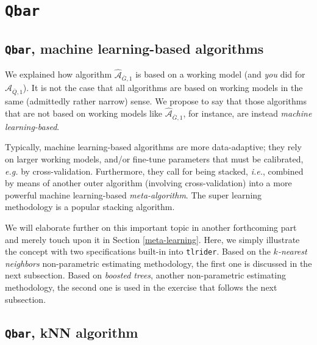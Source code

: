 \documentclass[
  11pt,
  openright,twoside]{book}
\newcommand{\Algo}{\widehat{\mathcal{A}}}
\newcommand{\Gbar}{\bar{G}}
\newcommand{\Qbar}{\bar{Q}}
\theoremstyle{definition}
\theoremstyle{definition}
\theoremstyle{definition}
\theoremstyle{definition}
\theoremstyle{remark}
\begin{document}

\hypertarget{nuisance-Qbar}{%
\section{\texorpdfstring{\texttt{Qbar}}{Qbar}}\label{nuisance-Qbar}}

\hypertarget{qbar-machine-learning-based-algorithms}{%
\subsection{\texorpdfstring{\texttt{Qbar}, machine learning-based algorithms}{Qbar, machine learning-based algorithms}}\label{qbar-machine-learning-based-algorithms}}


We explained how algorithm \(\Algo_{\Gbar,1}\) is based on a working model (and
\emph{you} did for \(\Algo_{\Qbar,1}\)). It is not the case that all algorithms are
based on working models in the same (admittedly rather narrow) sense. We
propose to say that those algorithms that are not based on working models like
\(\Algo_{\Gbar,1}\), for instance, are instead \emph{machine learning-based}.

Typically, machine learning-based algorithms are more data-adaptive; they rely
on larger working models, and/or fine-tune parameters that must be calibrated,
\emph{e.g.} by cross-validation. Furthermore,
they call for being stacked,
\emph{i.e.}, combined by means of another outer algorithm (involving
cross-validation) into a more powerful machine learning-based
\emph{meta-algorithm}. The super
learning methodology is a
popular stacking algorithm.

We will elaborate further on this important topic in another forthcoming part
and merely touch upon it in Section \ref{meta-learning}. Here, we simply
illustrate the concept with two specifications built-in into \texttt{tlrider}. Based
on the \emph{\(k\)-nearest neighbors} non-parametric estimating methodology, the
first one is discussed in the next subsection. Based on \emph{boosted trees},
another non-parametric estimating methodology, the second one is used in the
exercise that follows the next subsection.

\hypertarget{Qbar-knn-algo}{%
\subsection{\texorpdfstring{\texttt{Qbar}, kNN algorithm}{Qbar, kNN algorithm}}\label{Qbar-knn-algo}}
\end{document}
